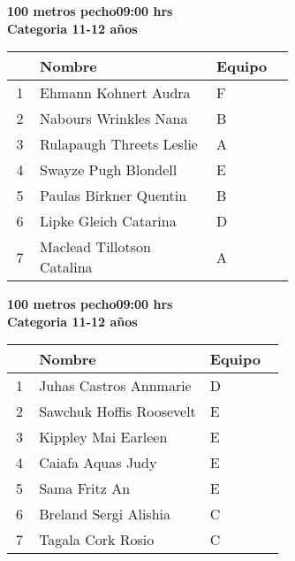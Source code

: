 \begin{minipage}{0.95\linewidth}\vspace{0.5cm} 
\begin{flushleft}
\textbf{
\hspace{-0.15cm}100 metros pecho\hspace{1.5cm}09:00 hrs \\Categoria 11-12 años}\vspace{-0.2cm} 
\end{flushleft}
\begin{tabular}{cp{0.63\linewidth}l}
\hline
& \textbf{Nombre} & \textbf{Equipo} \\ \hline
1 & Ehmann Kohnert Audra & F \\ 
2 & Nabours Wrinkles Nana & B \\ 
3 & Rulapaugh Threets Leslie & A \\ 
4 & Swayze Pugh Blondell & E \\ 
5 & Paulas Birkner Quentin & B \\ 
6 & Lipke Gleich Catarina & D \\ 
7 & Maclead Tillotson Catalina & A \\ 
\end{tabular}
\end{minipage}
\begin{minipage}{0.95\linewidth}\vspace{0.5cm} 
\begin{flushleft}
\textbf{
\hspace{-0.15cm}100 metros pecho\hspace{1.5cm}09:00 hrs \\Categoria 11-12 años}\vspace{-0.2cm} 
\end{flushleft}
\begin{tabular}{cp{0.63\linewidth}l}
\hline
& \textbf{Nombre} & \textbf{Equipo} \\ \hline
1 & Juhas Castros Annmarie & D \\ 
2 & Sawchuk Hoffis Roosevelt & E \\ 
3 & Kippley Mai Earleen & E \\ 
4 & Caiafa Aquas Judy & E \\ 
5 & Sama Fritz An & E \\ 
6 & Breland Sergi Alishia & C \\ 
7 & Tagala Cork Rosio & C \\ 
\end{tabular}
\end{minipage}
